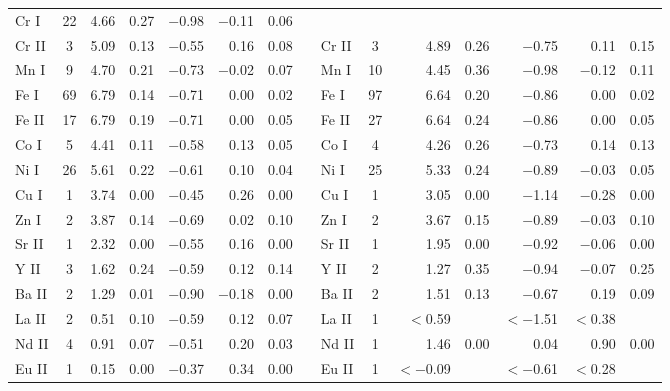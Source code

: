 \documentclass{emulateapj}
\begin{document}
\begin{longtable*}{lcrcrrcclcrcrrc}
  Cr \textsc{I} &  22 &    4.66 &    0.27 & $-$0.98 & $-$0.11 &    0.06 \\
 Cr \textsc{II} &   3 &    5.09 &    0.13 & $-$0.55 &    0.16 &    0.08 &&
 Cr \textsc{II} &   3 &    4.89 &    0.26 & $-$0.75 &    0.11 &    0.15 \\
  Mn \textsc{I} &   9 &    4.70 &    0.21 & $-$0.73 & $-$0.02 &    0.07 &&
  Mn \textsc{I} &  10 &    4.45 &    0.36 & $-$0.98 & $-$0.12 &    0.11 \\
  Fe \textsc{I} &  69 &    6.79 &    0.14 & $-$0.71 &    0.00 &    0.02 &&
  Fe \textsc{I} &  97 &    6.64 &    0.20 & $-$0.86 &    0.00 &    0.02 \\
 Fe \textsc{II} &  17 &    6.79 &    0.19 & $-$0.71 &    0.00 &    0.05 &&
 Fe \textsc{II} &  27 &    6.64 &    0.24 & $-$0.86 &    0.00 &    0.05 \\
  Co \textsc{I} &   5 &    4.41 &    0.11 & $-$0.58 &    0.13 &    0.05 &&
  Co \textsc{I} &   4 &    4.26 &    0.26 & $-$0.73 &    0.14 &    0.13 \\
  Ni \textsc{I} &  26 &    5.61 &    0.22 & $-$0.61 &    0.10 &    0.04 &&
  Ni \textsc{I} &  25 &    5.33 &    0.24 & $-$0.89 & $-$0.03 &    0.05 \\
  Cu \textsc{I} &   1 &    3.74 &    0.00 & $-$0.45 &    0.26 &    0.00 &&
  Cu \textsc{I} &   1 &    3.05 &    0.00 & $-$1.14 & $-$0.28 &    0.00 \\
  Zn \textsc{I} &   2 &    3.87 &    0.14 & $-$0.69 &    0.02 &    0.10 &&
  Zn \textsc{I} &   2 &    3.67 &    0.15 & $-$0.89 & $-$0.03 &    0.10 \\
 Sr \textsc{II} &   1 &    2.32 &    0.00 & $-$0.55 &    0.16 &    0.00 &&
 Sr \textsc{II} &   1 &    1.95 &    0.00 & $-$0.92 & $-$0.06 &    0.00 \\
  Y \textsc{II} &   3 &    1.62 &    0.24 & $-$0.59 &    0.12 &    0.14 &&
  Y \textsc{II} &   2 &    1.27 &    0.35 & $-$0.94 & $-$0.07 &    0.25 \\
 Ba \textsc{II} &   2 &    1.29 &    0.01 & $-$0.90 & $-$0.18 &    0.00 &&
 Ba \textsc{II} &   2 &    1.51 &    0.13 & $-$0.67 &    0.19 &    0.09 \\
 La \textsc{II} &   2 &    0.51 &    0.10 & $-$0.59 &    0.12 &    0.07 &&
 La \textsc{II} &   1 & $<$0.59 &         &$<-$1.51 & $<$0.38 &         \\
 Nd \textsc{II} &   4 &    0.91 &    0.07 & $-$0.51 &    0.20 &    0.03 &&
 Nd \textsc{II} &   1 &    1.46 &    0.00 &    0.04 &    0.90 &    0.00 \\
 Eu \textsc{II} &   1 &    0.15 &    0.00 & $-$0.37 &    0.34 &    0.00 &&
 Eu \textsc{II} &   1 &$<-$0.09 &         &$<-$0.61 & $<$0.28 &         \\


\end{longtable*}
\end{document}
